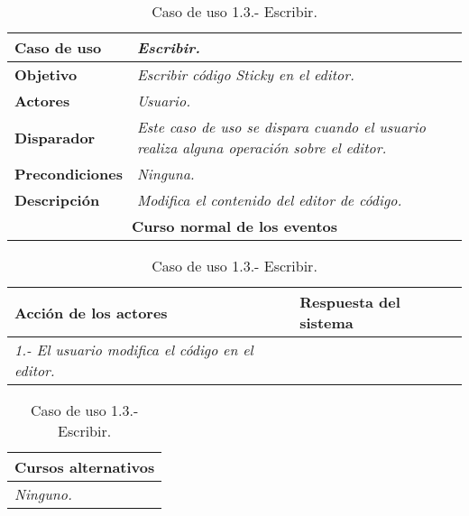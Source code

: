 \documentclass[twoside,a4paper,11pt]{book}
\begin{document}
\begin{table}[!ht]
    \centering
    \begin{tabular}{|p{4cm}|p{11.5cm}|}
    \hline

    \textbf{Caso de uso} & \textit{Escribir.}\\
    \hline

    \textbf{Objetivo} & \textit{Escribir código Sticky en el editor.}\\
    \hline

    \textbf{Actores} & \textit{Usuario.}\\
    \hline

    \textbf{Disparador} & \textit{Este caso de uso se dispara cuando el usuario realiza alguna operación sobre el editor.}\\
    \hline

    \textbf{Precondiciones} & \textit{Ninguna.}\\
    \hline

    \textbf{Descripción} & \textit{Modifica el contenido del editor de código.}\\
    \hline

    \multicolumn{2}{|c|}{\textbf{Curso normal de los eventos}}\\
    \hline

    \end{tabular}
    \begin{tabular}{|p{7.75cm}|p{7.75cm}|}
    \hspace{2cm}\textbf{Acción de los actores} & \hspace{1.75cm}\textbf{Respuesta del sistema}\\
    \hline

    \textit{1.- El usuario modifica el código en el editor.}
    &
    \\
    \hline
    \end{tabular}

    \begin{tabular}{|p{15.9cm}|}
      \hspace{6cm}\textbf{Cursos alternativos}\\
      \hline     
	\textit{Ninguno.}
      \\
      \hline
    \end{tabular}
    \caption{Caso de uso 1.3.- Escribir.}
\end{table}
\end{document}

